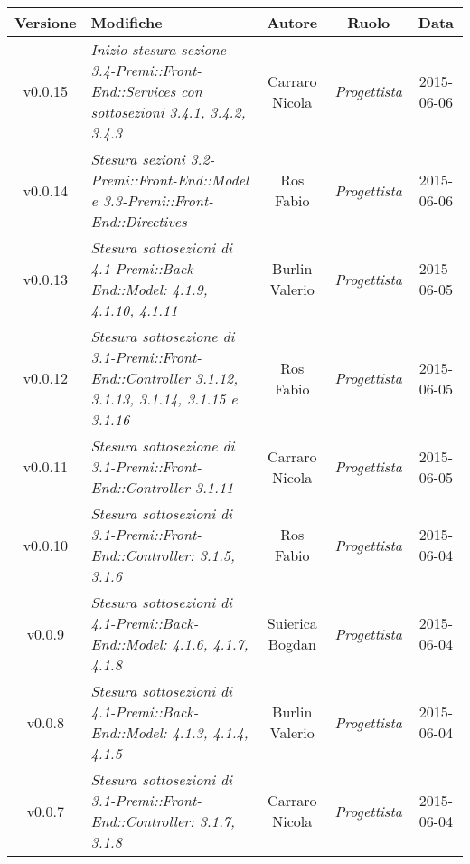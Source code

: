 \begin{table}[h]
	\centering
	\begin{tabular}{|c|p{}|c|c|c|}
		\toprule
			\textbf{Versione} & \textbf{Modifiche} & \textbf{Autore} & \textbf{Ruolo} & \textbf{Data}\\
		\midrule
		\midrule
			v0.0.15 & \textit{Inizio stesura sezione 3.4-Premi::Front-End::Services con sottosezioni 3.4.1, 3.4.2, 3.4.3} & Carraro Nicola & \textit{Progettista} & 2015-06-06\\
		\midrule
			v0.0.14 & \textit{Stesura sezioni 3.2-Premi::Front-End::Model e 3.3-Premi::Front-End::Directives} & Ros Fabio & \textit{Progettista} & 2015-06-06\\
		\midrule
			v0.0.13 & \textit{Stesura sottosezioni di 4.1-Premi::Back-End::Model: 4.1.9, 4.1.10, 4.1.11} & Burlin Valerio & \textit{Progettista} & 2015-06-05\\
		\midrule
			v0.0.12 & \textit{Stesura sottosezione di 3.1-Premi::Front-End::Controller 3.1.12, 3.1.13, 3.1.14, 3.1.15 e 3.1.16} & Ros Fabio & \textit{Progettista} & 2015-06-05\\
		\midrule
			v0.0.11 & \textit{Stesura sottosezione di 3.1-Premi::Front-End::Controller 3.1.11} & Carraro Nicola & \textit{Progettista} & 2015-06-05\\
		\midrule
			v0.0.10 & \textit{Stesura sottosezioni di 3.1-Premi::Front-End::Controller: 3.1.5, 3.1.6} & Ros Fabio & \textit{Progettista} & 2015-06-04\\
		\midrule
			v0.0.9 & \textit{Stesura sottosezioni di 4.1-Premi::Back-End::Model: 4.1.6, 4.1.7, 4.1.8} & Suierica Bogdan & \textit{Progettista} & 2015-06-04\\
		\midrule
			v0.0.8 & \textit{Stesura sottosezioni di 4.1-Premi::Back-End::Model: 4.1.3, 4.1.4, 4.1.5} & Burlin Valerio & \textit{Progettista} & 2015-06-04\\
		\midrule
			v0.0.7 & \textit{Stesura sottosezioni di 3.1-Premi::Front-End::Controller: 3.1.7, 3.1.8} & Carraro Nicola & \textit{Progettista} & 2015-06-04\\
		\bottomrule
\end{tabular}
\end{table}

\newpage

